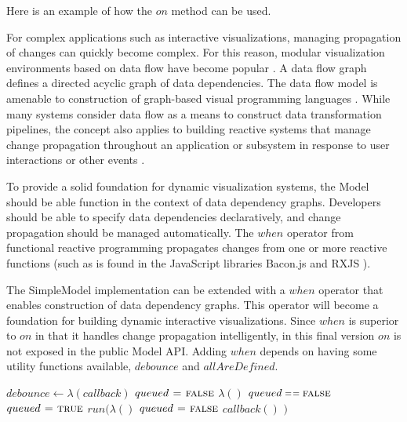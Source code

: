 Here is an example of how the $on$ method can be used.


For complex applications such as interactive visualizations, managing propagation of changes can quickly become complex. For this reason, modular visualization environments based on data flow have become popular \cite{abram1995extended}. A data flow graph defines a directed acyclic graph of data dependencies. The data flow model is amenable to construction of graph-based visual programming languages \cite{hils1992visual}. While many systems consider data flow as a means to construct data transformation pipelines, the concept also applies to building reactive systems that manage change propagation throughout an application or subsystem in response to user interactions or other events \cite{elliott1997functional}.

To provide a solid foundation for dynamic visualization systems, the Model should be able function in the context of data dependency graphs. Developers should be able to specify data dependencies declaratively, and change propagation should be managed automatically. The $when$ operator from functional reactive programming propagates changes from one or more reactive functions (such as is found in the JavaScript libraries Bacon.js \cite{baconJS} and RXJS \cite{rxjs}).

The SimpleModel implementation can be extended with a $when$ operator that enables construction of data dependency graphs. This operator will become a foundation for building dynamic interactive visualizations. Since $when$ is superior to $on$ in that it handles change propagation intelligently, in this final version $on$ is not exposed in the public Model API. Adding $when$ depends on having some utility functions available, $debounce$ and $allAreDefined$.

\begin{codebox}
\li $debounce \gets \lambda(callback)$ \label{debounceDef}
\Do
  \li $queued \mathrel{\hspace{1pt}=\hspace{1pt}} \textnormal{\scshape false}$ \label{queuedDef}
  \li \Return $\lambda()$ \label{debounced}
  \Do
    \li \If $queued \isequal \const{false}$ \label{queuedCheck}
    \Do
      \li $queued \mathrel{\hspace{1pt}=\hspace{1pt}} \textnormal{\scshape true}$ \label{queueSetTrue}
      \li $run(\lambda()$ \label{queuedFn}
      \Do
        \li $queued \mathrel{\hspace{1pt}=\hspace{1pt}} \textnormal{\scshape false}$ \label{queueSetFalse}
        \li $callback()$
      \End
      \li $)$
    \End
  \End
\End
\end{codebox}

